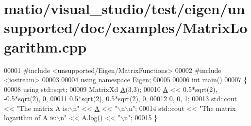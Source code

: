 \hypertarget{matio_2visual__studio_2test_2eigen_2unsupported_2doc_2examples_2_matrix_logarithm_8cpp_source}{}\section{matio/visual\+\_\+studio/test/eigen/unsupported/doc/examples/\+Matrix\+Logarithm.cpp}
\label{matio_2visual__studio_2test_2eigen_2unsupported_2doc_2examples_2_matrix_logarithm_8cpp_source}

\begin{DoxyCode}
00001 \textcolor{preprocessor}{#include <unsupported/Eigen/MatrixFunctions>}
00002 \textcolor{preprocessor}{#include <iostream>}
00003 
00004 \textcolor{keyword}{using namespace }\hyperlink{namespace_eigen}{Eigen};
00005 
00006 \textcolor{keywordtype}{int} main()
00007 \{
00008   \textcolor{keyword}{using} std::sqrt;
00009   MatrixXd \hyperlink{group___core___module_class_eigen_1_1_matrix}{A}(3,3);
00010   \hyperlink{group___core___module_class_eigen_1_1_matrix}{A} << 0.5*sqrt(2), -0.5*sqrt(2), 0,
00011        0.5*sqrt(2),  0.5*sqrt(2), 0,
00012        0,            0,           1;
00013   std::cout << \textcolor{stringliteral}{"The matrix A is:\(\backslash\)n"} << \hyperlink{group___core___module_class_eigen_1_1_matrix}{A} << \textcolor{stringliteral}{"\(\backslash\)n\(\backslash\)n"};
00014   std::cout << \textcolor{stringliteral}{"The matrix logarithm of A is:\(\backslash\)n"} << A.log() << \textcolor{stringliteral}{"\(\backslash\)n"};
00015 \}
\end{DoxyCode}
